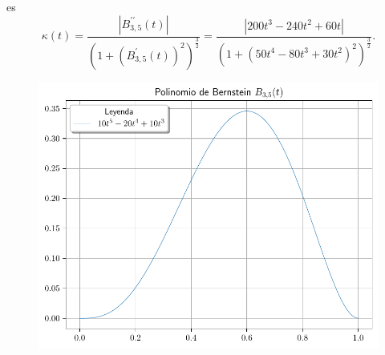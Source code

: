 \begin{frame}
\begin{solution}
        es
        \begin{equation*}
            \boxed{
            \kappa\left(t\right)=
            \dfrac{
                \left|
                B^{\prime\prime}_{3,5}\left(t\right)
                \right|
            }{
                {\left(1+{\left(B^{\prime}_{3,5}\left(t\right)\right)}^{2}\right)}^{\frac{3}{2}}
            }=
            \dfrac{
            \left|
            200t^{3}-240t^{2}+60t
            \right|
            }{
            {\left(1+{\left(50t^{4}-80t^{3}+30t^{2}\right)}^{2}\right)}^{\frac{3}{2}}
            }.
            }
        \end{equation*}
    \end{solution}
\end{frame}

\begin{frame}
    \begin{solution}
        \begin{figure}[ht!]
            \centering
            \includegraphics[width=.72\paperwidth]{p1}
        \end{figure}
    \end{solution}
\end{frame}

